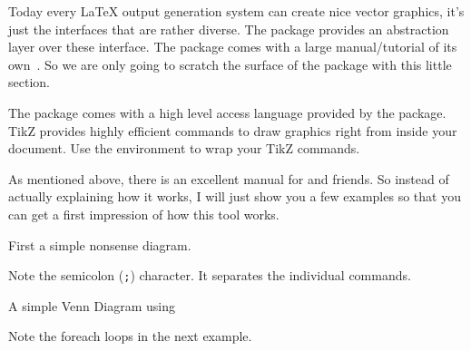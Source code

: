 Today every \LaTeX{} output generation system can create nice vector graphics,
it's just the interfaces that are rather diverse. The  package provides an
abstraction layer over these interface. The
 package comes with a large manual/tutorial of its own~\cite{pgfplot}.
So we are only going to scratch the surface of the package with this little
section.

The  package comes with a high level access language provided by the   package.
TikZ provides highly efficient commands to
draw graphics right from inside your document. Use the 
environment to wrap your TikZ commands.

As mentioned above, there is an excellent manual for  and friends. So
instead of actually explaining how it works, I will just show you a few examples
so that you can get a first impression of how this tool works.

First a simple nonsense diagram.
\begin{example}[examplewidth=0.45\linewidth]
\end{example}
Note the semicolon (\texttt{;}) character. It separates the individual commands.

\begin{listing}
  \begin{example}[vertical_mode, examplewidth=0.7\linewidth]
\end{example}
  \caption{A simple Venn Diagram using \TikZ{}}\label{lst:venn}
\end{listing}

Note the foreach loops in the next example.
\begin{example}
\end{example}

